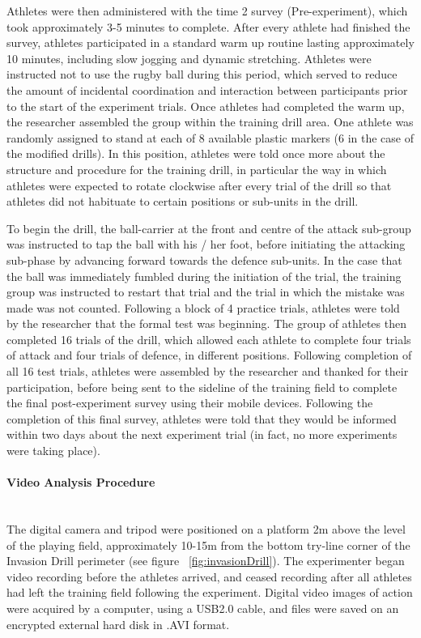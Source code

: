 \documentclass[english]{article}\usepackage[]{graphicx}\usepackage[]{color}
\newcommand{\myparagraph}[1]{\paragraph{#1}\mbox{}\\}
\begin{document}
Athletes were then administered with the time 2 survey (Pre-experiment), which took approximately 3-5 minutes to complete.  After every athlete had finished the survey, athletes participated in a standard warm up routine lasting approximately 10 minutes, including slow jogging and dynamic stretching.  Athletes were instructed not to use the rugby ball during this period, which served to reduce the amount of incidental coordination and interaction between participants prior to the start of the experiment trials.  Once athletes had completed the warm up, the researcher assembled the group within the training drill area.  One athlete was randomly assigned to stand at each of 8 available plastic markers (6 in the case of the modified drills).  In this position, athletes were told once more about the structure and procedure for the training drill, in particular the way in which athletes were expected to rotate clockwise after every trial of the drill so that athletes did not habituate to certain positions or sub-units in the drill.

To begin the drill, the ball-carrier at the front and centre of the attack sub-group was instructed to tap the ball with his / her foot, before initiating the attacking sub-phase by advancing forward towards the defence sub-units.  In the case that the ball was immediately fumbled during the initiation of the trial, the training group was instructed to restart that trial and the trial in which the mistake was made was not counted.  Following a block of 4 practice trials, athletes were told by the researcher that the formal test was beginning.  The group of athletes then completed 16 trials of the drill, which allowed each athlete to complete four trials of attack and four trials of defence, in different positions.  Following completion of all 16 test trials, athletes were assembled by the researcher and thanked for their participation, before being sent to the sideline of the training field to complete the final post-experiment survey using their mobile devices.  Following the completion of this final survey, athletes were told that they would be informed within two days about the next experiment trial (in fact, no more experiments were taking place).

\myparagraph{Video Analysis Procedure}
The digital camera and tripod were positioned on a platform 2m above the level of the playing field, approximately 10-15m from the bottom try-line corner of the Invasion Drill perimeter (see figure ~\ref{fig:invasionDrill}).  The experimenter began video recording before the athletes arrived, and ceased recording after all athletes had left the training field following the experiment.  Digital video images of action were acquired by a computer, using a USB2.0 cable, and files were saved on an encrypted external hard disk in .AVI format.
\end{document}
